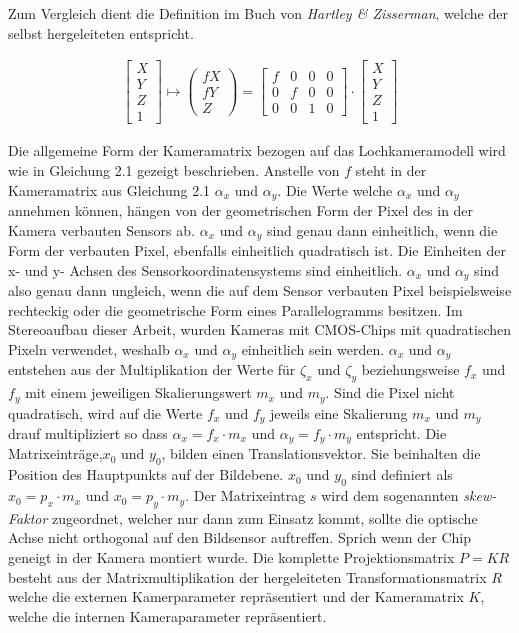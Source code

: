 Zum Vergleich dient die Definition im Buch von \textit{Hartley \& Zisserman}\cite{HZ}, welche der selbst hergeleiteten entspricht.


\begin{gather}
\begin{bmatrix}
X\\Y\\Z\\1
\end{bmatrix} \mapsto
\begin{pmatrix}
f X\\ f Y\\ Z
\end{pmatrix}
=
\begin{bmatrix}
f&0&0&0\\
0&f&0&0\\
0&0&1&0
\end{bmatrix}
\cdot
\begin{bmatrix}
X\\Y\\Z\\1
\end{bmatrix}
\end{gather}		


Die allgemeine Form der Kameramatrix bezogen auf das Lochkameramodell wird wie in Gleichung 2.1 gezeigt beschrieben. Anstelle von $f$ steht in der Kameramatrix aus Gleichung 2.1 $\alpha_x$ und $\alpha_y$. Die Werte welche $\alpha_x$ und $\alpha_y$ annehmen können, hängen von der geometrischen Form der Pixel des in der Kamera verbauten Sensors ab\cite{HZ,Photonik}.  $\alpha_x$ und $\alpha_y$ sind genau dann einheitlich, wenn die Form der verbauten Pixel, ebenfalls einheitlich quadratisch ist. Die Einheiten der x- und y- Achsen des Sensorkoordinatensystems sind einheitlich. $\alpha_x$ und $\alpha_y$ sind also genau dann ungleich, wenn die auf dem Sensor verbauten Pixel beispielsweise rechteckig oder die geometrische Form eines Parallelogramms besitzen\cite{HZ}. Im Stereoaufbau dieser Arbeit, wurden Kameras mit CMOS-Chips mit quadratischen Pixeln verwendet, weshalb $\alpha_x$ und $\alpha_y$ einheitlich sein werden. $\alpha_x$ und $\alpha_y$ entstehen aus der Multiplikation der Werte für $\zeta_x$ und $\zeta_y$ beziehungsweise  $f_x$ und $f_y$ mit einem jeweiligen Skalierungswert $m_x$ und $m_y$. Sind die Pixel nicht quadratisch, wird auf die Werte $f_x$ und $f_y$ jeweils eine Skalierung $m_x$ und $m_y$ drauf multipliziert so dass  $\alpha_x = f_x \cdot m_x$ und $\alpha_y = f_y \cdot m_y$ entspricht\cite{HZ}. Die Matrixeinträge,$x_{0}$ und $y_{0}$, bilden einen Translationsvektor. Sie beinhalten die Position des Hauptpunkts auf der Bildebene. $x_{0}$ und $y_{0}$ sind definiert als $x_{0} = p_x \cdot m_x$ und $x_{0} = p_y \cdot m_y$. Der Matrixeintrag $s$ wird dem sogenannten \textit{skew-Faktor} zugeordnet, welcher nur dann zum Einsatz kommt, sollte die optische Achse nicht orthogonal auf den Bildsensor auftreffen. Sprich wenn der Chip geneigt in der Kamera montiert wurde\cite{HZ}. Die komplette Projektionsmatrix $P=KR$\cite{HZ} besteht aus der Matrixmultiplikation der hergeleiteten Transformationsmatrix $R$ welche die externen Kamerparameter repräsentiert und der Kameramatrix $K$, welche die internen Kameraparameter repräsentiert\cite{HZ,ZZGXr}.


